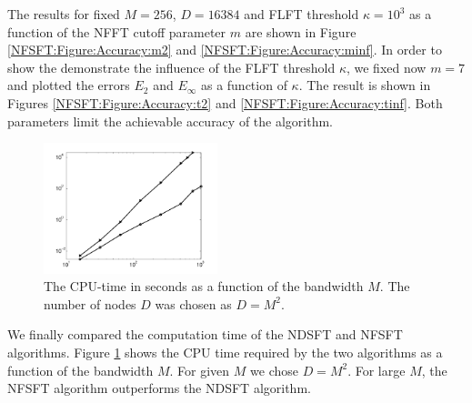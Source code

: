 The results for fixed $M = 256$, $D = 16384$ and FLFT threshold 
$\kappa=10^3$ as a function of the NFFT cutoff parameter $m$ 
are shown in Figure \ref{NFSFT:Figure:Accuracy:m2} and 
\ref{NFSFT:Figure:Accuracy:minf}. In order to show the
demonstrate the influence of the FLFT threshold $\kappa$, we fixed now 
$m=7$ and plotted the errors $E_{2}$ and $E_{\infty}$ as a function
of $\kappa$. The result is shown in Figures \ref{NFSFT:Figure:Accuracy:t2}
and \ref{NFSFT:Figure:Accuracy:tinf}. Both parameters limit 
the achievable accuracy of the algorithm.

\begin{figure}[tb]
  \centering
  \includegraphics[width=0.45\textwidth]{images/timing}
  \caption{The CPU-time in seconds as a function of the bandwidth $M$. 
  The number of nodes $D$ was chosen as $D=M^2$.}
  \label{NFSFT:Figure:Timing}
\end{figure}

We finally compared the computation time of the NDSFT and NFSFT algorithms.
Figure \ref{NFSFT:Figure:Timing} shows the CPU time required by the two
algorithms as a
function of the bandwidth $M$. For given $M$ we chose $D=M^2$. For large 
$M$, the NFSFT algorithm outperforms the NDSFT algorithm.

